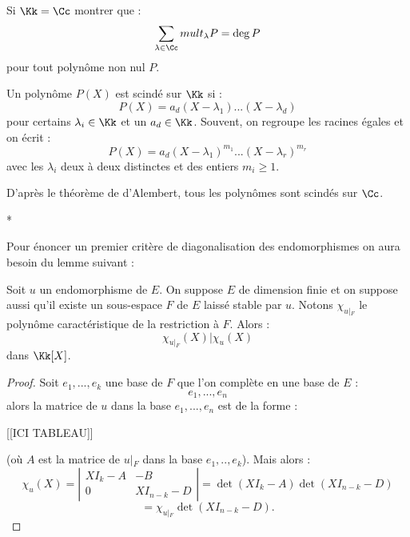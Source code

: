 \documentclass[class=report,crop=false]{standalone}
\newcommand{\Res}[1]{{\left | {}_{#1} \right.}}
\newcommand{\mult}{mult}
\begin{document}
\begin{exercicecours}

Si $\Kk = \Cc$ montrer que :
\[\sum_{\lambda \in \Cc}\mult_\lambda P = \deg P\]
pour tout polynôme non nul $P$.
\end{exercicecours}

\begin{definition}[scindé]
Un polynôme $P(X)$ est scindé  sur $\Kk$ si :
\[P(X) = a_d(X-\lambda_1)...(X-\lambda_d)\]
pour certains $\lambda_i \in \Kk$ et un $a_d \in \Kk$. Souvent, on regroupe les racines égales et on écrit :
\[P(X) = a_d(X-\lambda_1)^{m_1}...(X-\lambda_r)^{m_r}\]
avec les $\lambda_i$ deux à deux distinctes et des entiers $m_i  \ge 1$.
\end{definition}

\begin{exemple}
D'après le théorème de d'Alembert, tous les polynômes sont scindés sur $\Cc$. 
\end{exemple}
\begin{center}
*
\end{center}

Pour énoncer un premier critère de diagonalisation des endomorphismes on aura besoin du lemme suivant :

\begin{lemme}\label{lem:restr}
Soit $u$ un endomorphisme de $E$. On suppose $E$ de dimension finie et on suppose aussi qu'il existe un sous-espace $F$ de $E$ laissé stable  par $u$. Notons $\chi_{u\Res{F}}$ le polynôme caractéristique de la restriction à $F$. Alors :
\[\chi_{u\Res{F}}(X) |\chi_u(X)\]
dans $\Kk[X]$.
\end{lemme}

\begin{proof}
Soit $e_1,...,e_k$ une base de $F$ que l'on complète en une base de $E$ :
\[e_1,...,e_n\]
alors la matrice de $u$ dans la base $e_1,...,e_n$ est de la forme :

[[ICI TABLEAU]]



(où $A$ est la matrice de $u\Res{F}$ dans la base $e_1,..,e_k$). Mais alors :
\[\chi_u(X) = \left|\begin{array}{c|c}
XI_k-A & -B\\\hline
0 & XI_{n-k} - D
\end{array}\right| = \det (XI_k-A) \det(XI_{n-k}-D)\]
\[= \chi_{u\Res{F}} \det(XI_{n-k}-D) .\] 
\end{proof}
\end{document}
